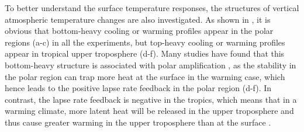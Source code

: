 
To better understand the surface temperature responses, the structures of vertical atmospheric temperature changes are also investigated. As shown in , it is obvious that bottom-heavy cooling or warming profiles appear in the polar regions (a-c) in all the experiments, but top-heavy cooling or warming profiles appear in tropical upper troposphere (d-f). Many studies have found that this bottom-heavy structure is associated with polar amplification \citep{Screen2012, Pithan2014, Kim2018, Park2018}, as the stability in the polar region can trap more heat at the surface in the warming case, which hence leads to the positive lapse rate feedback in the polar region (d-f). In contrast, the lapse rate feedback is negative in the tropics, which means that in a warming climate, more latent heat will be released in the upper troposphere and thus cause greater warming in the upper troposphere than at the surface \citep{Pithan2014}.

